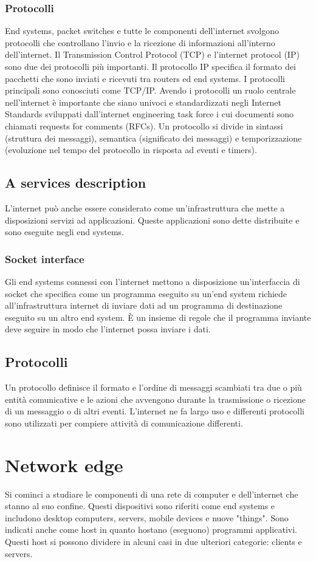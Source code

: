 \subsubsection{Protocolli}
End systems, packet switches e tutte le componenti dell'internet svolgono protocolli che controllano l'invio e la ricezione di informazioni all'interno dell'internet. Il Transmission Control Protocol (TCP) e 
l'internet protocol (IP) sono due dei protocolli pi\`u importanti. Il protocollo IP specifica il formato dei pacchetti che sono inviati e ricevuti tra routers ed end systems. I protocolli principali sono conosciuti come 
TCP/IP. Avendo i protocolli un ruolo centrale nell'internet \`e importante che siano univoci e standardizzati negli Internet Standards sviluppati dall'internet engineering task force i cui documenti sono chiamati
requests for comments (RFCs). Un protocollo si divide in sintassi (struttura dei messaggi), semantica (significato dei messaggi) e temporizzazione (evoluzione nel tempo del protocollo in risposta ad eventi e 
timers).
\subsection{A services description}
L'internet pu\`o anche essere considerato come un'infrastruttura che mette a disposizioni servizi ad applicazioni. Queste applicazioni sono dette distribuite e sono eseguite negli end systems. 
\subsubsection{Socket interface}
Gli end systems connessi con l'internet mettono a disposizione un'interfaccia di socket che specifica come un programma eseguito su un'end system richiede all'infrastruttura internet di inviare dati ad un
programma di destinazione eseguito su un altro end system. \`E un insieme di regole che il programma inviante deve seguire in modo che l'internet possa inviare i dati. 
\subsection{Protocolli}
Un protocollo definisce il formato e l'ordine di messaggi scambiati tra due o pi\`u entit\`a comunicative e le azioni che avvengono durante la trasmissione o ricezione di un messaggio o di altri eventi. L'internet
ne fa largo uso e differenti protocolli sono utilizzati per compiere attivit\`a di comunicazione differenti. 
\section{Network edge}
Si cominci a studiare le componenti di una rete di computer e dell'internet che stanno al suo confine. Questi dispositivi sono riferiti come end systems e includono desktop computers, servers, mobile devices e 
nuove "things". Sono indicati anche come host in quanto hostano (eseguono) programmi applicativi. Questi host si possono dividere in alcuni casi in due ulteriori categorie: clients e servers. 

